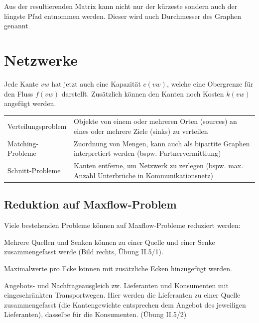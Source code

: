 Aus der resultierenden Matrix kann nicht nur der kürzeste sondern auch der längste Pfad entnommen werden. Dieser wird auch Durchmesser des Graphen genannt.


%
%
\section{Netzwerke}
Jede Kante $vw$ hat jetzt auch eine Kapazität $c(vw)$, welche eine Obergrenze für den Fluss $f(vw)$ darstellt. Zusätzlich können den Kanten noch Kosten $k(vw)$ angefügt werden.
  
  \begin{tabularx}{\textwidth}{l X}
    Verteilungsproblem
      & Objekte von einem oder mehreren Orten (sources) an eines oder mehrere Ziele (sinks) zu verteilen\\
    Matching-Probleme
      & Zuordnung von Mengen, kann auch als bipartite Graphen interpretiert werden (bspw. Partnervermittlung) \\
    Schnitt-Probleme
      & Kanten entferne, um Netzwerk zu zerlegen (bspw. max. Anzahl Unterbrüche in Kommunikationsnetz)\\
  \end{tabularx}

\subsection{Reduktion auf Maxflow-Problem}

Viele bestehenden Probleme können auf Maxflow-Probleme reduziert werden:
    
    \begin{liste}
      \item Mehrere Quellen und Senken können zu einer Quelle und einer Senke zusammengefasst werde (Bild rechts, Übung II.5/1).
      \item Maximalwerte pro Ecke können mit zusätzliche Ecken hinzugefügt werden.
      \item Angebots- und Nachfrageausgleich zw. Lieferanten und Konsumenten mit eingeschränkten Transportwegen. Hier werden die Lieferanten zu einer Quelle zusammengefasst (die Kantengewichte entsprechen dem Angebot des jeweiligen Lieferanten), dasselbe für die Konsumenten. (Übung II.5/2)
    \end{liste}

